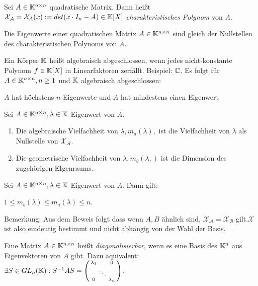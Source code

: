 \begin{definition}
	Sei $A \in \mathbb{K}^{n \times n}$ quadratische Matrix. Dann heißt $\mathcal{X_A} = \mathcal{X}_A(x) := det(x \cdot I_n -A) \in \mathbb{K}[X]$ \emph{charakteristisches Polynom} von $A$.
\end{definition}

\begin{satz}
	Die Eigenwerte einer quadratischen Matrix $A \in \mathbb{K}^{n \times n}$ sind gleich der Nullstellen des charakteristischen Polynoms von $A$. 
\end{satz}

\begin{definition}
	Ein Körper $\mathbb{K}$ heißt algebraisch abgeschlossen, wenn jedes nicht-konstante Polynom $f \in \mathbb{K}[X]$ in Linearfaktoren zerfällt. Beispiel: $\mathbb{C}$. Es folgt für $A \in \mathbb{K}^{n \times n}, n \geq 1$ und $\mathbb{K}$ algebraisch abgeschlossen:
	\begin{description}[noitemsep]
		\item $A$ hat höchstens $n$ Eigenwerte und $A$ hat mindestens einen Eigenwert
	\end{description}
\end{definition}

\begin{definition}
	Sei $A \in \mathbb{K}^{n \times n}, \lambda \in \mathbb{K}$ Eigenwert von $A$.
	\begin{enumerate}[noitemsep]
		\item Die algebraische Vielfachheit von $\lambda, m_a(\lambda),$ ist die Vielfachheit von $\lambda$ als Nullstelle von $\mathcal{X_A}$.
		\item Die geometrische Vielfachheit von $\lambda, m_g(\lambda,)$ ist die Dimension des zugehörigen EIgenraums.
	\end{enumerate}
\end{definition}

\begin{satz}
	Sei $A \in \mathbb{K}^{n \times n}, \lambda \in \mathbb{K}$ Eigenwert von $A$. Dann gilt:
	
	$1 \leq m_b(\lambda) \leq m_a(\lambda) \leq n$.
	
	Bemerkung: Aus dem Beweis folgt dass wenn $A, B$ ähnlich sind, $\mathcal{X_A} = \mathcal{X_B}$ gilt.$\mathcal{X}$
 ist also eindeutig bestimmt und nicht abhängig von der Wahl der Basis. \end{satz}

\begin{definition}[Diagonalisierbarkeit]
	Eine Matrix $A \in \mathbb{K}^{n \times n}$ heißt \emph{diagonalisierbar}, wenn es eine Basis des $\mathbb{K}^n$ aus Eigenvektoren von $A$ gibt. Dazu äquivalent: $\exists S \in GL_n(\mathbb{K}) : S^{-1} A S = \left( \begin{smallmatrix}
	\lambda_1 & & 0 \\
	& \ddots & \\
	0 & & \lambda_n
	\end{smallmatrix} \right)$.
\end{definition}

